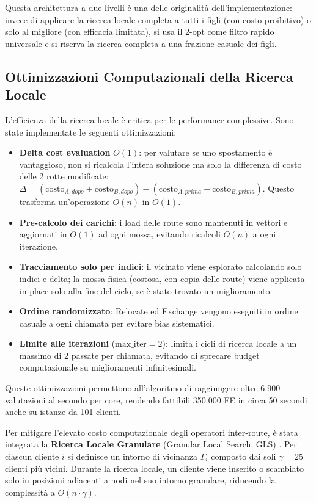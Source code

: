 Questa architettura a due livelli \`e una delle originalit\`a dell'implementazione:
invece di applicare la ricerca locale completa a tutti i figli (con costo proibitivo)
o solo al migliore (con efficacia limitata), si usa il 2-opt come filtro rapido
universale e si riserva la ricerca completa a una frazione casuale dei figli.

\subsection{Ottimizzazioni Computazionali della Ricerca Locale}

L'efficienza della ricerca locale \`e critica per le performance complessive. Sono
state implementate le seguenti ottimizzazioni:
\begin{itemize}
    \item \textbf{Delta cost evaluation} $O(1)$: per valutare se uno spostamento
          \`e vantaggioso, non si ricalcola l'intera soluzione ma solo la differenza
          di costo delle 2 rotte modificate: $\Delta = (\text{costo}_{A, dopo} +
          \text{costo}_{B, dopo}) - (\text{costo}_{A, prima} + \text{costo}_{B,
          prima})$. Questo trasforma un'operazione $O(n)$ in $O(1)$.
    \item \textbf{Pre-calcolo dei carichi}: i load delle route sono mantenuti in
          vettori e aggiornati in $O(1)$ ad ogni mossa, evitando ricalcoli $O(n)$
          a ogni iterazione.
    \item \textbf{Tracciamento solo per indici}: il vicinato viene esplorato
          calcolando solo indici e delta; la mossa fisica (costosa, con copia
          delle route) viene applicata in-place solo alla fine del ciclo, se \`e
          stato trovato un miglioramento.
    \item \textbf{Ordine randomizzato}: Relocate ed Exchange vengono eseguiti in
          ordine casuale a ogni chiamata per evitare bias sistematici.
    \item \textbf{Limite alle iterazioni} ($\text{max\_iter}=2$): limita i cicli
          di ricerca locale a un massimo di 2 passate per chiamata, evitando di
          sprecare budget computazionale su miglioramenti infinitesimali.
\end{itemize}

Queste ottimizzazioni permettono all'algoritmo di raggiungere oltre 6.900 valutazioni
al secondo per core, rendendo fattibili 350.000 FE in circa 50 secondi anche su
istanze da 101 clienti.

Per mitigare l'elevato costo computazionale degli operatori inter-route, \`e stata
integrata la \textbf{Ricerca Locale Granulare} (Granular Local Search, GLS)
\cite{toth2003granular}. Per
ciascun cliente $i$ si definisce un intorno di vicinanza $\Gamma_i$ composto dai soli
$\gamma = 25$ clienti pi\`u vicini. Durante la ricerca locale, un cliente viene
inserito o scambiato solo in posizioni adiacenti a nodi nel suo intorno granulare,
riducendo la complessit\`a a $O(n \cdot \gamma)$.

